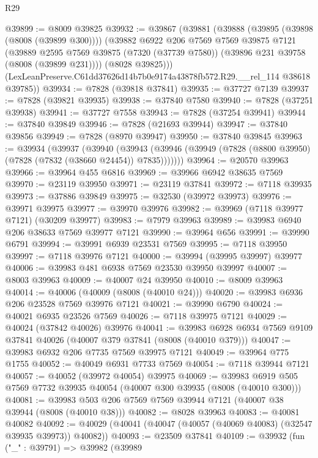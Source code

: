 \begin{lexlean}{R29}
\begin{coremodule}
@39899 := @8009 @39825
@39932 := @39867
    (@39881
      (@39888
        (@39895 (@39898 (@8008 (@39899 @300))))
        (@39882
          @6922
          @206
          @7569
          @7569
          @39875
          @7121
          (@39889
            @2595
            @7569
            @39875
            (@7320 (@37739 @7580))
            (@39896 @231 @39758 (@8008 (@39899 @231))))
          (@8028 @39825)))
      (LexLeanPreserve.C61dd37626d14b7b0e9174a43878fb572.R29.__rel_114 @38618 @39785))
@39934 := @7828 (@39818 @37841)
@39935 := @37727 @7139
@39937 := @7828 (@39821 @39935)
@39938 := @37840 @7580
@39940 := @7828 (@37251 @39938)
@39941 := @37727 @7558
@39943 := @7828 (@37254 @39941)
@39944 := @37840 @39849
@39946 := @7828 (@21693 @39944)
@39947 := @37840 @39856
@39949 := @7828 (@8970 @39947)
@39950 := @37840 @39845
@39963 := @39934
    (@39937
      (@39940
        (@39943 (@39946 (@39949 (@7828 (@8800 @39950) (@7828 (@7832 (@38660 @24454)) @7835)))))))
@39964 := @20570 @39963
@39966 := @39964 @455 @6816
@39969 := @39966 @6942 @38635 @7569
@39970 := @23119 @39950
@39971 := @23119 @37841
@39972 := @7118 @39935
@39973 := @37886 @39849
@39975 := @32530 (@39972 @39973)
@39976 := @39971 @39975
@39977 := @39970 @39976
@39982 := @39969 (@7118 @39977 @7121) (@30209 @39977)
@39983 := @7979 @39963
@39989 := @39983 @6940 @206 @38633 @7569 @39977 @7121
@39990 := @39964 @656
@39991 := @39990 @6791
@39994 := @39991 @6939 @23531 @7569
@39995 := @7118 @39950
@39997 := @7118 @39976 @7121
@40000 := @39994 (@39995 @39997) @39977
@40006 := @39983 @481 @6938 @7569 @23530 @39950 @39997
@40007 := @8003 @39963
@40009 := @40007 @24 @39950
@40010 := @8009 @39963
@40014 := @40006 (@40009 (@8008 (@40010 @24)))
@40020 := @39983 @6936 @206 @23528 @7569 @39976 @7121
@40021 := @39990 @6790
@40024 := @40021 @6935 @23526 @7569
@40026 := @7118 @39975 @7121
@40029 := @40024 (@37842 @40026) @39976
@40041 := @39983 @6928 @6934 @7569 @9109 @37841 @40026 (@40007 @379 @37841 (@8008 (@40010 @379)))
@40047 := @39983 @6932 @206 @7735 @7569 @39975 @7121
@40049 := @39964 @775 @1755
@40052 := @40049 @6931 @7733 @7569
@40054 := @7118 @39944 @7121
@40057 := @40052 (@39972 @40054) @39975
@40069 := @39983 @6919 @505 @7569 @7732 @39935 @40054 (@40007 @300 @39935 (@8008 (@40010 @300)))
@40081 := @39983 @503 @206 @7569 @7569 @39944 @7121 (@40007 @38 @39944 (@8008 (@40010 @38)))
@40082 := @8028 @39963
@40083 := @40081 @40082
@40092 := @40029 (@40041 (@40047 (@40057 (@40069 @40083) (@32547 @39935 @39973)) @40082))
@40093 := @23509 @37841
@40109 := @39932
    (fun ("_" : @39791) =>
    @39982
      (@39989

\end{coremodule}
\end{lexlean}
